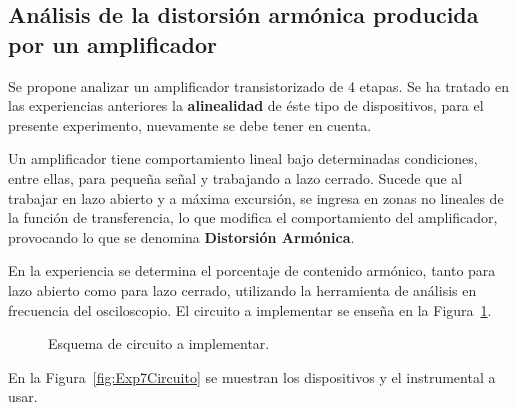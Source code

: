  \subsection{Análisis de la distorsión armónica producida por un amplificador}
    Se propone analizar un amplificador transistorizado de 4 etapas. Se ha tratado 
    en las experiencias anteriores la \textbf{alinealidad} de éste tipo de dispositivos, 
    para el presente experimento, nuevamente se debe tener en cuenta. 

    Un amplificador tiene comportamiento lineal bajo determinadas condiciones, entre ellas, 
    para pequeña señal y trabajando a lazo cerrado. Sucede que al trabajar en lazo abierto y 
    a máxima excursión, se ingresa en zonas no lineales de la función de transferencia, lo que 
    modifica el comportamiento del amplificador, provocando lo que se denomina 
    \textbf{Distorsión Armónica}.

    En la experiencia se determina el porcentaje de contenido armónico, tanto para lazo 
    abierto como para lazo cerrado, utilizando la 
    herramienta de análisis en frecuencia del osciloscopio. El circuito a implementar 
    se enseña en la Figura~\ref{fig:Exp7EsquemaCircuito}.

      \begin{figure}[H]
        \centering
          \caption{Esquema de circuito a implementar.}
          \label{fig:Exp7EsquemaCircuito}
      \end{figure}

    En la Figura~\ref{fig:Exp7Circuito} se muestran los dispositivos y el 
    instrumental a usar.

